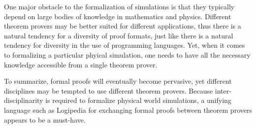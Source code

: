 One major obstacle to the formalization of simulations is that they
typically depend on large bodies of knowledge in mathematics and physics.
Different theorem provers may be better suited for different applications,
thus there is a natural tendency for a diversity of proof formats, just
like there is a natural tendency for diversity in the use of programming
languages.
Yet, when it comes to formalizing a particular phyical simulation, one needs
to have all the necessary knowledge accessible from a single theorem prover.

To summarize, formal proofs will eventually become pervasive, yet
different disciplines may be tempted to use different theorem provers.
Because inter-disciplinarity is required to formalize physical world simulations,
a unifying language such as Logipedia for exchanging formal proofs between
theorem provers appears to be a must-have.



